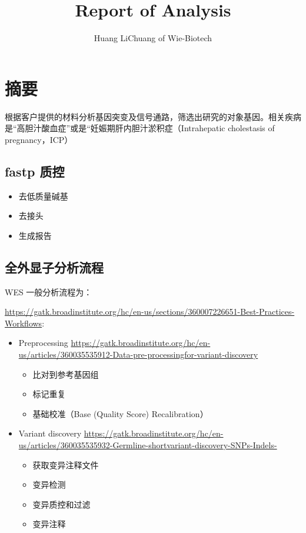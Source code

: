 \documentclass[
]{article}
\title{Report of Analysis}
\author{Huang LiChuang of Wie-Biotech}
\date{}
\providecommand{\tightlist}{%
  \setlength{\itemsep}{0pt}\setlength{\parskip}{0pt}}
\begin{document}
\maketitle

{
\setcounter{tocdepth}{3}
\tableofcontents
}
\listoffigures

\listoftables

\hypertarget{abstract}{%
\section{摘要}\label{abstract}}

根据客户提供的材料分析基因突变及信号通路，筛选出研究的对象基因。相关疾病是``高胆汁酸血症''或是``妊娠期肝内胆汁淤积症（Intrahepatic cholestasis of pregnancy，ICP）

\hypertarget{fastp-ux8d28ux63a7}{%
\subsection{fastp 质控}\label{fastp-ux8d28ux63a7}}

\begin{itemize}
\tightlist
\item
  去低质量碱基
\item
  去接头
\item
  生成报告
\end{itemize}

\hypertarget{workflow}{%
\subsection{全外显子分析流程}\label{workflow}}

WES 一般分析流程为：

\url{https://gatk.broadinstitute.org/hc/en-us/sections/360007226651-Best-Practices-Workflows}:

\begin{itemize}
\tightlist
\item
  Preprocessing \url{https://gatk.broadinstitute.org/hc/en-us/articles/360035535912-Data-pre-processingfor-variant-discovery}

  \begin{itemize}
  \tightlist
  \item
    比对到参考基因组
  \item
    标记重复
  \item
    基础校准（Base (Quality Score) Recalibration）
  \end{itemize}
\item
  Variant discovery \url{https://gatk.broadinstitute.org/hc/en-us/articles/360035535932-Germline-shortvariant-discovery-SNPs-Indels-}

  \begin{itemize}
  \tightlist
  \item
    获取变异注释文件
  \item
    变异检测
  \item
    变异质控和过滤
  \item
    变异注释
  \end{itemize}
\end{itemize}
\end{document}
